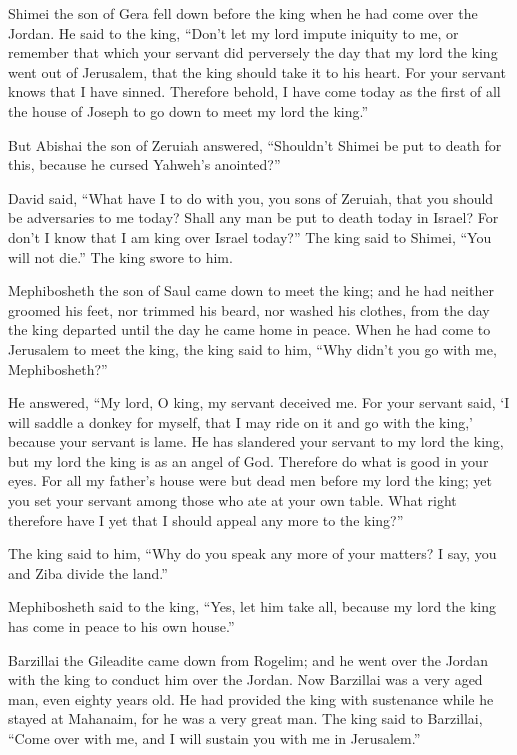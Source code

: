 Shimei the son of Gera fell down before the king when he had come over
the Jordan.  He said to the king, ``Don't let my lord
impute iniquity to me, or remember that which your servant did
perversely the day that my lord the king went out of Jerusalem, that the
king should take it to his heart.  For your servant knows
that I have sinned. Therefore behold, I have come today as the first of
all the house of Joseph to go down to meet my lord the king.''

 But Abishai the son of Zeruiah answered, ``Shouldn't
Shimei be put to death for this, because he cursed Yahweh's anointed?''

 David said, ``What have I to do with you, you sons of
Zeruiah, that you should be adversaries to me today? Shall any man be
put to death today in Israel? For don't I know that I am king over
Israel today?''  The king said to Shimei, ``You will not
die.'' The king swore to him.

 Mephibosheth the son of Saul came down to meet the king;
and he had neither groomed his feet, nor trimmed his beard, nor washed
his clothes, from the day the king departed until the day he came home
in peace.  When he had come to Jerusalem to meet the
king, the king said to him, ``Why didn't you go with me, Mephibosheth?''

 He answered, ``My lord, O king, my servant deceived me.
For your servant said, `I will saddle a donkey for myself, that I may
ride on it and go with the king,' because your servant is lame.
 He has slandered your servant to my lord the king, but
my lord the king is as an angel of God. Therefore do what is good in
your eyes.  For all my father's house were but dead men
before my lord the king; yet you set your servant among those who ate at
your own table. What right therefore have I yet that I should appeal any
more to the king?''

 The king said to him, ``Why do you speak any more of
your matters? I say, you and Ziba divide the land.''

 Mephibosheth said to the king, ``Yes, let him take all,
because my lord the king has come in peace to his own house.''

 Barzillai the Gileadite came down from Rogelim; and he
went over the Jordan with the king to conduct him over the Jordan.
 Now Barzillai was a very aged man, even eighty years
old. He had provided the king with sustenance while he stayed at
Mahanaim, for he was a very great man.  The king said to
Barzillai, ``Come over with me, and I will sustain you with me in
Jerusalem.''


